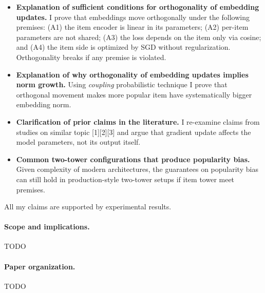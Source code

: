 \begin{itemize}
    \item \textbf{Explanation of sufficient conditions for orthogonality of embedding updates.} I prove that embeddings move orthogonally under the following premises: (A1) the item encoder is linear in its parameters; (A2) per-item parameters are not shared; (A3) the loss depends on the item only via cosine; and (A4) the item side is optimized by SGD without regularization. Orthogonality breaks if any premise is violated.
    \item \textbf{Explanation of why orthogonality of embedding updates implies norm growth.} Using \emph{coupling} probabilistic technique I prove that orthogonal movement makes more popular item have systematically bigger embedding norm.  
    \item \textbf{Clarification of prior claims in the literature.} I re-examine claims from studies on similar topic [1][2][3] and argue that gradient update affects the model parameters, not its output itself.
    \item \textbf{Common two-tower configurations that produce popularity bias.} Given complexity of modern architectures, the guarantees on popularity bias can still hold in production-style two-tower setups if item tower meet premises.
\end{itemize}

All my claims are supported by experimental results.

\paragraph{Scope and implications.} TODO

\paragraph{Paper organization.} TODO